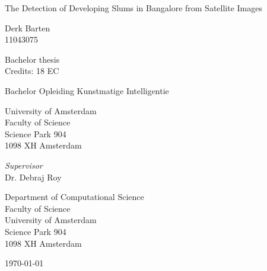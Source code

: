 \begin{center}

\vspace{1.7cm}

\begin{Huge}
The Detection of Developing Slums in Bangalore from Satellite Images
\end{Huge}


\vspace{1.5cm}

Derk Barten\\
11043075

\vspace{1.5cm}

Bachelor thesis\\
Credits: 18 EC

\vspace{0.5cm}

Bachelor Opleiding Kunstmatige Intelligentie

\vspace{0.25cm}

University of Amsterdam\\
Faculty of Science\\
Science Park 904\\
1098 XH Amsterdam

\vspace{4cm}

\emph{Supervisor}\\
Dr. Debraj Roy

\vspace{0.25cm}

Department of Computational Science\\
Faculty of Science\\
University of Amsterdam\\
Science Park 904\\
1098 XH  Amsterdam

\vspace{1.5cm}

\today

\end{center}

